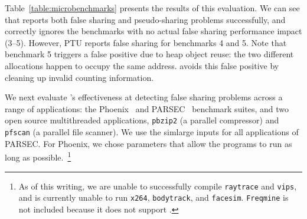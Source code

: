 Table~\ref{table:microbenchmarks} presents the results of this
evaluation. We can see that \sheriffdetect{} reports both false sharing
 and pseudo-sharing
 problems successfully, and correctly
ignores the benchmarks with no actual false sharing performance
impact (3--5). However, PTU reports false sharing for benchmarks 4 and
5. Note that benchmark 5 
triggers a false positive due to heap object reuse:
the two different allocations happen to occupy the same address.
\sheriffdetect{} avoids this false positive by cleaning up invalid counting
information.



We next evaluate \sheriffdetect{}'s effectiveness at detecting false
sharing problems across a range of applications: the
Phoenix~\cite{phoenix-hpca} and PARSEC~\cite{parsec} benchmark suites,
and two open source multithreaded applications, \texttt{pbzip2} (a
parallel compressor) and \texttt{pfscan} (a parallel file scanner). We
use the simlarge inputs for all applications of PARSEC.  For Phoenix,
we chose parameters that allow the programs to run as long as
possible.~\footnote{As of this writing, we are unable to successfully
compile \texttt{raytrace} and \texttt{vips}, and \sheriff{} is
currently unable to run \texttt{x264}, \texttt{bodytrack},
and \texttt{facesim}. \texttt{Freqmine} is not included because it
does not support \pthreads{}. }
 



